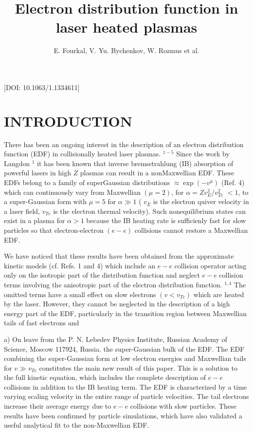 \documentclass[oneside,onecolumn]{article}
\date{}
\title{Electron distribution function in laser heated plasmas}
\author{E. Fourkal,  V. Yu. Bychenkov,   W. Rozmus et al.}
\begin{document}
 \begin{sloppypar}
 
 \maketitle
 
 
 [DOI: 10.1063/1.1334611]
 
 \section{INTRODUCTION}
 There has been an ongoing interest in the description of an electron distribution function (EDF) in collisionally heated laser plasmas. ${ }^{1-5}$ Since the work by Langdon ${ }^{1}$ it has been known that inverse bremsstrahlung (IB) absorption of powerful lasers in high $Z$ plasmas can result in a nonMaxwellian EDF. These EDFs belong to a family of superGaussian distributions $\approx \exp \left(-v^{\mu}\right)$ (Ref. 4) which can continuously vary from Maxwellian $(\mu=2)$, for $\alpha=Z v_{E}^{2} / v_{T e}^{2}$ $<1$, to a super-Gaussian form with $\mu=5$ for $\alpha \gg 1$ ( $v_{E}$ is the electron quiver velocity in a laser field, $v_{T e}$ is the electron thermal velocity). Such nonequilibrium states can exist in a plasma for $\alpha>1$ because the IB heating rate is sufficienly fast for slow particles so that electron-electron $(e-e)$ collisions cannot restore a Maxwellian EDF.
 
 We have noticed that these results have been obtained from the approximate kinetic models (cf. Refs. 1 and 4) which include an $e-e$ collision operator acting only on the isotropic part of the distribution function and neglect $e-e$ collision terms involving the anisotropic part of the electron distribution function. ${ }^{1,4}$ The omitted terms have a small effect on slow electrons $\left(v<v_{T e}\right)$ which are heated by the laser. However, they cannot be neglected in the description of a high energy part of the EDF, particularly in the transition region between Maxwellian tails of fast electrons and
 
 a) On leave from the P. N. Lebedev Physics Institute, Russian Academy of Science, Moscow 117924, Russia. the super-Gaussian bulk of the EDF. The EDF combining the super-Gaussian form at low electron energies and Maxwellian tails for $v \gg v_{T e}$ constitutes the main new result of this paper. This is a solution to the full kinetic equation, which includes the complete description of $e-e$ collisions in addition to the IB heating term. The EDF is characterized by a time varying scaling velocity in the entire range of particle velocities. The tail electrons increase their average energy due to $e-e$ collisions with slow particles. These results have been confirmed by particle simulations, which have also validated a useful analytical fit to the non-Maxwellian EDF.
 

\end{sloppypar}
\end{document}
